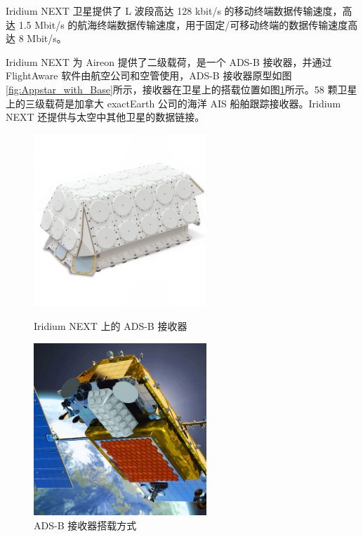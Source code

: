 \begin{itemize}
    Iridium NEXT 卫星提供了 L 波段高达 128 kbit/s 的移动终端数据传输速度，高达 1.5 Mbit/s 的航海终端数据传输速度，用于固定/可移动终端的数据传输速度高达 8 Mbit/s。

    Iridium NEXT 为 Aireon 提供了二级载荷，是一个 ADS-B 接收器，并通过 FlightAware 软件由航空公司和空管使用，ADS-B 接收器原型如图\ref{fig:Appstar_with_Base}所示，接收器在卫星上的搭载位置如图\ref{fig:reconfigurable_multimission_payloads}所示。58 颗卫星上的三级载荷是加拿大 exactEarth 公司的海洋 AIS 船舶跟踪接收器。Iridium NEXT 还提供与太空中其他卫星的数据链接。

    \begin{figure}[!htb]
    \centering
    \begin{minipage}[t]{0.48\textwidth}
    \centering
    \includegraphics[width=6.5cm]{pic/Appstar_with_Base_2000x2000.jpg}
    \caption{Iridium NEXT 上的 ADS-B 接收器}
    \label{fig:Appstar_with_Base}
    \end{minipage}
    \begin{minipage}[t]{0.48\textwidth}
    \centering
    \includegraphics[width=6.5cm]{pic/reconfigurable_multimission_payloads_v2_web.jpg}
    \caption{ADS-B 接收器搭载方式}
    \label{fig:reconfigurable_multimission_payloads}
    \end{minipage}
    \end{figure}

\end{itemize}

